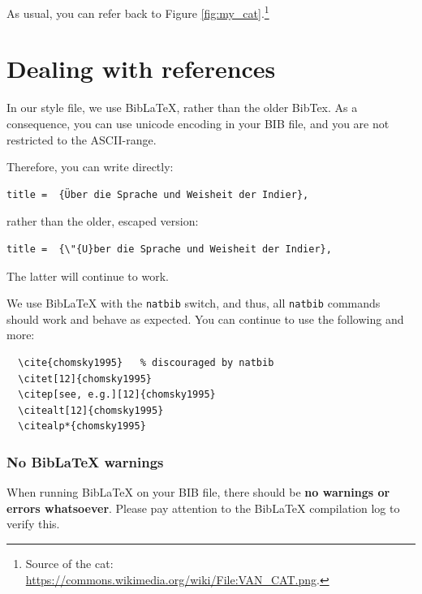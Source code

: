 As usual, you can refer back to Figure \ref{fig:my_cat}.\footnote{Source of the cat: \href{https://commons.wikimedia.org/wiki/File:VAN_CAT.png}{https://commons.wikimedia.org/wiki/File:VAN\_CAT.png}.}

\section{Dealing with references}

In our style file, we use BibLaTeX, rather than the older BibTex. As a consequence, you can use unicode encoding in your BIB file, and you are not restricted to the ASCII-range.

Therefore, you can write directly:

\begin{verbatim}
title =  {Über die Sprache und Weisheit der Indier},
\end{verbatim}

rather than the older, escaped version:

\begin{verbatim}
title =  {\"{U}ber die Sprache und Weisheit der Indier},
\end{verbatim}

The latter will continue to work.

We use BibLaTeX with the \texttt{natbib} switch, and thus, all \texttt{natbib} commands  should work and behave as expected. You can continue to use the following and more:

\begin{verbatim}
  \cite{chomsky1995}   % discouraged by natbib
  \citet[12]{chomsky1995}
  \citep[see, e.g.][12]{chomsky1995}
  \citealt[12]{chomsky1995}
  \citealp*{chomsky1995}
\end{verbatim}

\subsubsection*{No BibLaTeX warnings}

When running BibLaTeX on your BIB file, there should be \textbf{no warnings or errors whatsoever}. Please pay attention to the BibLaTeX compilation log to verify this.

